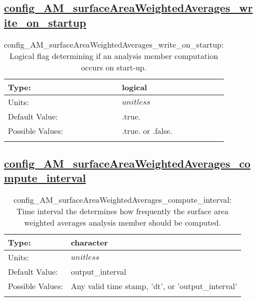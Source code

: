 \subsection[config\_AM\_surfaceAreaWeightedAverages\_write\_on\_startup]{\hyperref[sec:nm_tab_AM_surfaceAreaWeightedAverages]{config\_AM\_surfaceAreaWeightedAverages\_write\_on\_startup}}
\label{subsec:nm_sec_config_AM_surfaceAreaWeightedAverages_write_on_startup}
\begin{center}
\begin{longtable}{| p{2.0in} || p{4.0in} |}
    \hline
    Type: & logical \\
    \hline
    Units: & $unitless$ \\
    \hline
    Default Value: & .true. \\
    \hline
    Possible Values: & .true. or .false. \\
    \hline
    \caption{config\_AM\_surfaceAreaWeightedAverages\_write\_on\_startup: Logical flag determining if an analysis member computation occurs on start-up.}
\end{longtable}
\end{center}
\subsection[config\_AM\_surfaceAreaWeightedAverages\_compute\_interval]{\hyperref[sec:nm_tab_AM_surfaceAreaWeightedAverages]{config\_AM\_surfaceAreaWeightedAverages\_compute\_interval}}
\label{subsec:nm_sec_config_AM_surfaceAreaWeightedAverages_compute_interval}
\begin{center}
\begin{longtable}{| p{2.0in} || p{4.0in} |}
    \hline
    Type: & character \\
    \hline
    Units: & $unitless$ \\
    \hline
    Default Value: & output\_interval \\
    \hline
    Possible Values: & Any valid time stamp, 'dt', or 'output\_interval' \\
    \hline
    \caption{config\_AM\_surfaceAreaWeightedAverages\_compute\_interval: Time interval the determines how frequently the surface area weighted averages analysis member should be computed.}
\end{longtable}
\end{center}
